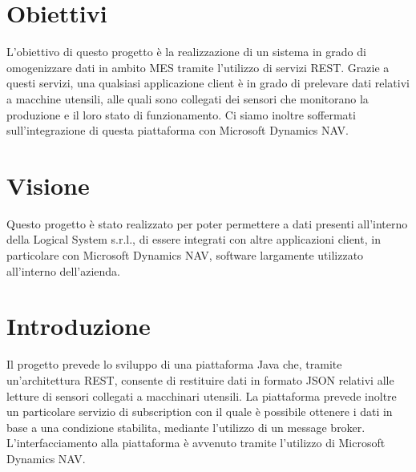 \begin{titlepage}





 

\vfill %

\end{titlepage}
\section{Obiettivi}
L'obiettivo di questo progetto è la realizzazione di un sistema in grado di omogenizzare dati in ambito MES tramite l'utilizzo di servizi REST. Grazie a questi servizi, una qualsiasi applicazione client è in grado di prelevare dati relativi a macchine utensili, alle quali sono collegati dei sensori che monitorano la produzione e il loro stato di funzionamento. Ci siamo inoltre soffermati sull'integrazione di questa piattaforma con Microsoft Dynamics NAV.
\section{Visione}
Questo progetto è stato realizzato per poter permettere a dati presenti all'interno della Logical System s.r.l., di essere integrati con altre applicazioni client, in particolare con Microsoft Dynamics NAV, software largamente utilizzato all'interno dell'azienda.
\section{Introduzione}
Il progetto prevede lo sviluppo di una piattaforma Java che, tramite un'architettura REST, consente di restituire dati in formato JSON relativi alle letture di sensori collegati a macchinari utensili. La piattaforma prevede inoltre un particolare servizio di subscription con il quale è possibile ottenere i dati in base a una condizione stabilita, mediante l’utilizzo di un message broker. L’interfacciamento alla piattaforma è avvenuto tramite l’utilizzo di Microsoft Dynamics NAV.
\clearpage
